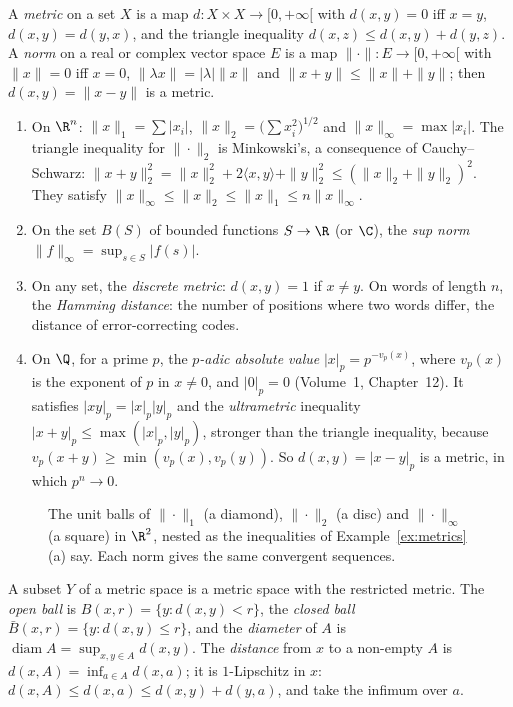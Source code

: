 \begin{definition}
A \emph{metric} on a set $X$ is a map $d:X\times X\to[0,+\infty[$ with $d(x,y)=0$ iff $x=y$, $d(x,y)=d(y,x)$, and the triangle inequality
$d(x,z)\le d(x,y)+d(y,z)$. A \emph{norm} on a real or complex vector space $E$ is a map $\|\cdot\|:E\to[0,+\infty[$ with $\|x\|=0$ iff $x=0$,
$\|\lambda x\|=|\lambda|\|x\|$ and $\|x+y\|\le\|x\|+\|y\|$; then $d(x,y)=\|x-y\|$ is a metric.
\end{definition}

\begin{example}\label{ex:metrics}
\begin{enumerate}[label=(\alph*)]
\item On $\R^n$: $\|x\|_1=\sum|x_i|$, $\|x\|_2=\bigl(\sum x_i^2\bigr)^{1/2}$ and $\|x\|_\infty=\max|x_i|$. The triangle inequality for $\|\cdot\|_2$ is Minkowski's, a
consequence of Cauchy--Schwarz: $\|x+y\|_2^2=\|x\|_2^2+2\langle x,y\rangle+\|y\|_2^2\le(\|x\|_2+\|y\|_2)^2$. They satisfy
$\|x\|_\infty\le\|x\|_2\le\|x\|_1\le n\|x\|_\infty$.
\item On the set $B(S)$ of bounded functions $S\to\R$ (or $\C$), the \emph{sup norm} $\|f\|_\infty=\sup_{s\in S}|f(s)|$.
\item On any set, the \emph{discrete metric}: $d(x,y)=1$ if $x\ne y$. On words of length $n$, the \emph{Hamming distance}: the number of
positions where two words differ, the distance of error-correcting codes.
\item On $\Q$, for a prime $p$, the \emph{$p$-adic absolute value} $|x|_p=p^{-v_p(x)}$, where $v_p(x)$ is the exponent of $p$ in $x\ne0$, and $|0|_p=0$
(Volume~1, Chapter~12). It satisfies $|xy|_p=|x|_p|y|_p$ and the \emph{ultrametric} inequality $|x+y|_p\le\max(|x|_p,|y|_p)$, stronger than the
triangle inequality, because $v_p(x+y)\ge\min(v_p(x),v_p(y))$. So $d(x,y)=|x-y|_p$ is a metric, in
which $p^n\to0$.
\end{enumerate}
\end{example}

\begin{figure}[ht]
\centering
{}
\caption{The unit balls of $\|\cdot\|_1$ (a diamond), $\|\cdot\|_2$ (a disc) and $\|\cdot\|_\infty$ (a square) in $\R^2$, nested as the inequalities of
Example~\ref{ex:metrics}(a) say. Each norm gives the same convergent sequences.}
\label{fig:balls}
\end{figure}

A subset $Y$ of a metric space is a metric space with the restricted metric. The \emph{open ball} is $B(x,r)=\{y:d(x,y)<r\}$, the
\emph{closed ball} $\bar B(x,r)=\{y:d(x,y)\le r\}$, and the \emph{diameter} of $A$ is $\operatorname{diam}A=\sup_{x,y\in A}d(x,y)$. The \emph{distance} from $x$ to a
non-empty $A$ is $d(x,A)=\inf_{a\in A}d(x,a)$; it is $1$-Lipschitz in $x$: $d(x,A)\le d(x,a)\le d(x,y)+d(y,a)$, and take the infimum over $a$.

